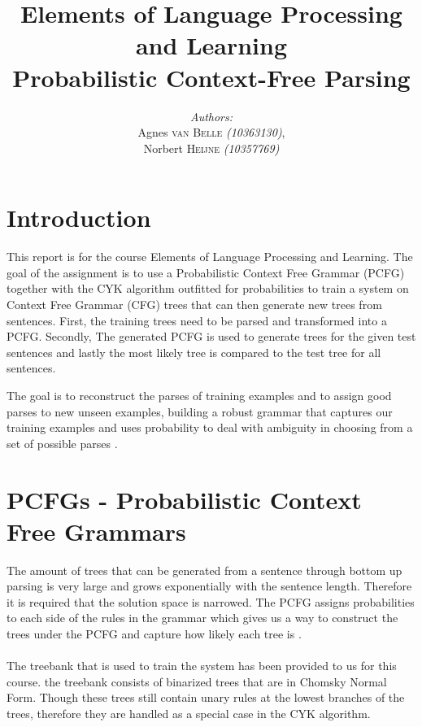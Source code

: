 \documentclass[11pt,twocolumn]{article}
\title{Elements of Language Processing and Learning\\Probabilistic Context-Free Parsing}
\author{
		\emph{Authors:}\\[0.2cm]
		Agnes \textsc{van Belle} \small{ \emph{(10363130)}},\\ 
		Norbert \textsc{Heijne} \small{ \emph{(10357769)}}
		}
\begin{document}
	\maketitle

\section{Introduction}
This report is for the course Elements of Language Processing and Learning. The goal of the assignment is to use a Probabilistic Context Free Grammar (PCFG) together with the CYK algorithm outfitted for probabilities to train a system on Context Free Grammar (CFG) trees that can then generate new trees from sentences. First, the training trees need to be parsed and transformed into a PCFG. Secondly, The generated PCFG is used to generate trees for the given test sentences and lastly the most likely tree is compared to the test tree for all sentences.

The goal is to reconstruct the parses of training examples and to assign good parses to new unseen examples, building a robust grammar that captures our training examples and uses probability to deal with ambiguity in choosing from a set of possible parses \cite{slides2}.

\section{PCFGs - Probabilistic Context Free Grammars}
The amount of trees that can be generated from a sentence through bottom up parsing is very large and grows exponentially with the sentence length. Therefore it is required that the solution space is narrowed. The PCFG assigns probabilities to each side of the rules in the grammar which gives us a way to construct the trees under the PCFG and capture how likely each tree is \cite{slides2}.\\\\

The treebank that is used to train the system has been provided to us for this course. the treebank consists of binarized trees that are in Chomsky Normal Form. Though these trees still contain unary rules at the lowest branches of the trees, therefore they are handled as a special case in the CYK algorithm.
\end{document}
